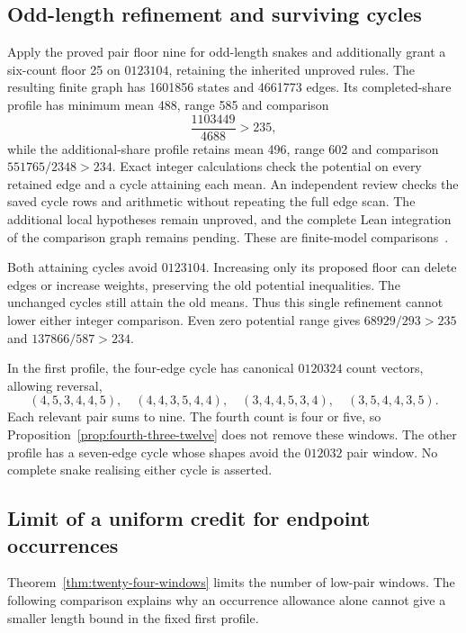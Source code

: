 \documentclass[11pt,a4paper]{article}
\theoremstyle{definition}
\theoremstyle{remark}
\begin{document}
\subsection{Odd-length refinement and surviving cycles}\label{sec:odd-refined-model}
Apply the proved pair floor nine for odd-length snakes and additionally grant
a six-count floor 25 on $0123104$, retaining the inherited unproved rules.
The resulting finite graph has 1601856 states and 4661773 edges. Its
completed-share profile has minimum mean 488, range 585 and comparison
\[
\frac{1103449}{4688}>235,
\]
while the additional-share profile retains mean 496, range 602 and comparison
$551765/2348>234$. Exact integer calculations check the potential on every
retained edge and a cycle attaining each mean. An independent review checks
the saved cycle rows and arithmetic without repeating the full edge scan.
The additional local hypotheses remain unproved, and the complete Lean
integration of the comparison graph remains pending. These are finite-model comparisons~\cite{latercomparisonarchive}.

Both attaining cycles avoid $0123104$. Increasing only its proposed floor
can delete edges or increase weights, preserving the old potential
inequalities. The unchanged cycles still attain the old means. Thus this
single refinement cannot lower either integer comparison. Even zero potential
range gives $68929/293>235$ and $137866/587>234$.

In the first profile, the four-edge cycle has canonical $0120324$ count
vectors, allowing reversal,
\[
(4,5,3,4,4,5),\quad(4,4,3,5,4,4),\quad
(3,4,4,5,3,4),\quad(3,5,4,4,3,5).
\]
Each relevant pair sums to nine. The fourth count is four or five, so
Proposition~\ref{prop:fourth-three-twelve} does not remove these windows.
The other profile has a seven-edge cycle whose shapes avoid the $012032$
pair window. No complete snake realising either cycle is asserted.

\subsection{Limit of a uniform credit for endpoint occurrences}\label{sec:occurrence-credit-limit}
Theorem~\ref{thm:twenty-four-windows} limits the number of low-pair windows.
The following comparison explains why an occurrence allowance alone cannot
give a smaller length bound in the fixed first profile.
\end{document}
